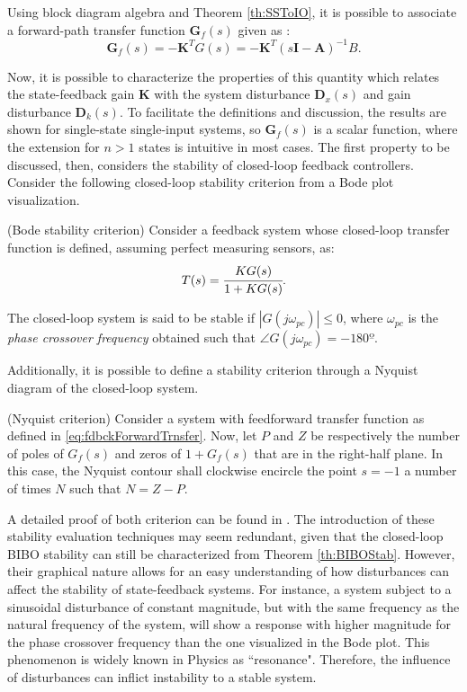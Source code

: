 \documentclass[a4paper,11pt]{book}
\numberwithin{figure}{chapter}
\numberwithin{equation}{chapter}
\numberwithin{table}{chapter}
\newtheorem{theorem}{Theorem}[chapter]
\theoremstyle{definition}
\newcounter{boxed-theorem}
\newenvironment{boxed-theorem}[1]
{\colorlet{shadecolor}{pastelBlue2!5} \begin{shaded} \begin{theorem}{#1}}
{\end{theorem} \end{shaded}}
\newcounter{boxed-lemma}
\newcounter{boxed-definition}
\newcounter{boxed-example}
\begin{document}
Using block diagram algebra and Theorem \ref{th:SSToIO}, it is possible to associate a forward-path transfer function $\bm{G}_{f}(s)$ given as \cite{Moore:1990}:
\begin{equation} \label{eq:fdbckForwardTrnsfer}
    \bm{G}_{f}(s) = -\bm{K}^T G(s) =  -\bm{K}^{T} \left(s \bm{I} - \bm{A} \right)^{-1} B 
.\end{equation}

Now, it is possible to characterize the properties of this quantity which relates the state-feedback gain $\bm{K}$ with the system disturbance $\bm{D}_x(s)$ and gain disturbance $\bm{D}_k(s)$. To facilitate the definitions and discussion, the results are shown for single-state single-input systems, so $\bm{G}_f(s)$ is a scalar function, where the extension for $n > 1$ states is intuitive in most cases. The first property to be discussed, then, considers the stability of closed-loop feedback controllers. Consider the following closed-loop stability criterion from a Bode plot visualization.

\begin{boxed-theorem}{(Bode stability criterion)}
    Consider a feedback system whose closed-loop transfer function is defined, assuming perfect measuring sensors, as:
    \begin{equation}
        T(s) = \cfrac{K G(s)}{1 + K G(s)}
    .\end{equation}
    
    The closed-loop system is said to be stable if $| G(j \omega_{pc}) | \leq 0 $, where $\omega_{pc}$ is the \textit{phase crossover frequency} obtained such that $\angle G(j \omega_{pc}) = -180º$.
\end{boxed-theorem}

Additionally, it is possible to define a stability criterion through a Nyquist diagram of the closed-loop system.

\begin{boxed-theorem}{(Nyquist criterion)}
    Consider a system with feedforward transfer function as defined in \eqref{eq:fdbckForwardTrnsfer}. Now, let $P$ and $Z$ be respectively the number of poles of $G_{f}(s)$ and zeros of $1 + G_{f}(s)$ that are in the right-half plane. In this case, the Nyquist contour shall clockwise encircle the point $s = -1$ a number of times $N$ such that $N = Z - P$.
\end{boxed-theorem}

A detailed proof of both criterion can be found in \cite{Nise:2015}. The introduction of these stability evaluation techniques may seem redundant, given that the closed-loop BIBO stability can still be characterized from Theorem \ref{th:BIBOStab}. However, their graphical nature allows for an easy understanding of how disturbances can affect the stability of state-feedback systems. For instance, a system subject to a sinusoidal disturbance of constant magnitude, but with the same frequency as the natural frequency of the system, will show a response with higher magnitude for the phase crossover frequency than the one visualized in the Bode plot. This phenomenon is widely known in Physics as ``resonance". Therefore, the influence of disturbances can inflict instability to a stable system.
\end{document}
